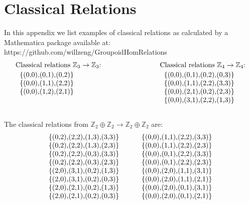 \chapter{Classical Relations}
\label{app:clRel}

In this appendix we list examples of classical relations as calculated by a Mathematica package available at: 
{\small https://github.com/willzeng/GroupoidHomRelations}
\begin{align*}
\begin{tabular}{lcl}
Classical relations $\mathbb{Z}_3\to\mathbb{Z}_3$:  & \hspace{60pt} & Classical relations $\mathbb{Z}_4\to\mathbb{Z}_4$:  \\[-10pt]
\begin{tabular}{l}
\{(0,0),(0,1),(0,2)\} \\
\{(0,0),(1,1),(2,2)\} \\
\{(0,0),(1,2),(2,1)\} 
\end{tabular} & &
\begin{tabular}{l}
\\
\{(0,0),(0,1),(0,2),(0,3)\} \\
\{(0,0),(1,1),(2,2),(3,3)\} \\
\{(0,0),(2,1),(0,2),(2,3)\} \\
\{(0,0),(3,1),(2,2),(1,3)\} 
\end{tabular}
\end{tabular}
\end{align*}
\\
\noindent The classical relations from  $\mathbb{Z}_2\oplus\mathbb{Z}_2\to\mathbb{Z}_2\oplus\mathbb{Z}_2$ are:
\begin{align*}
\begin{tabular}{cc}
\{(0,2),(2,2),(1,3),(3,3)\} &\qquad \{(0,0),(1,1),(2,2),(3,3)\} \\
\{(0,2),(2,2),(1,3),(2,3)\} &\qquad \{(0,0),(1,1),(2,2),(2,3)\} \\
\{(0,2),(2,2),(0,3),(3,3)\} &\qquad \{(0,0),(0,1),(2,2),(3,3)\} \\
\{(0,2),(2,2),(0,3),(2,3)\} &\qquad \{(0,0),(0,1),(2,2),(2,3)\} \\
\{(2,0),(3,1),(0,2),(1,3)\} &\qquad \{(0,0),(2,0),(1,1),(3,1)\} \\
\{(2,0),(3,1),(0,2),(0,3)\} &\qquad \{(0,0),(2,0),(1,1),(2,1)\} \\
\{(2,0),(2,1),(0,2),(1,3)\} &\qquad \{(0,0),(2,0),(0,1),(3,1)\} \\
\{(2,0),(2,1),(0,2),(0,3)\} &\qquad \{(0,0),(2,0),(0,1),(2,1)\} \\
\end{tabular}
\end{align*}
\newpage
